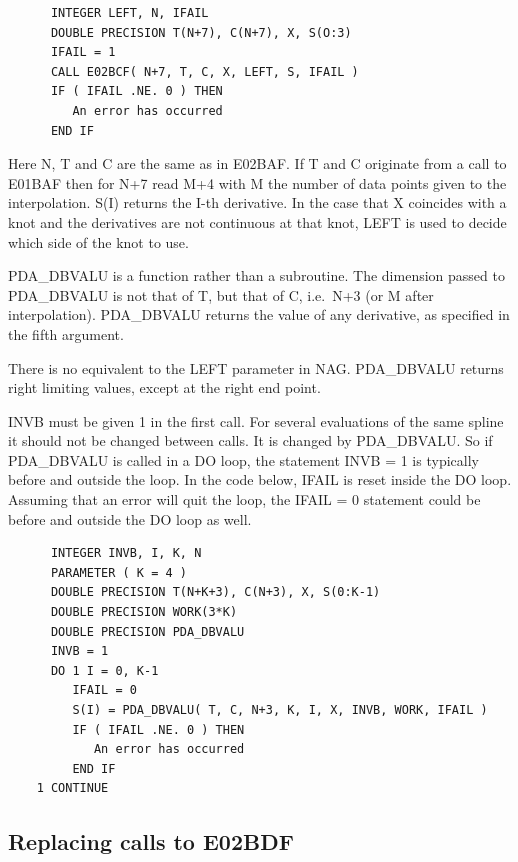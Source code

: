 \documentclass[11pt,twoside]{article}
\newcommand{\htmlref}[2]{#1}
\newcommand{\xlabel}[1]{}
\begin{document}
\begin{verbatim}
      INTEGER LEFT, N, IFAIL
      DOUBLE PRECISION T(N+7), C(N+7), X, S(O:3)
      IFAIL = 1
      CALL E02BCF( N+7, T, C, X, LEFT, S, IFAIL )
      IF ( IFAIL .NE. 0 ) THEN
         An error has occurred
      END IF
\end{verbatim}

   Here N, T and C are the same as in
\htmlref{E02BAF.}{m_e02baf}
   If T and C originate from
   a call to
\htmlref{E01BAF}{m_e01baf}
   then for N+7 read M+4 with M the number of data
   points given to the interpolation. S(I) returns the I-th derivative.
   In the case that X coincides with a knot and the derivatives are not
   continuous at that knot, LEFT is used to decide which side of the
   knot to use.

   PDA\_DBVALU is a function rather than a subroutine. The dimension passed
   to PDA\_DBVALU is not that of T, but that of C, i.e.\ N+3 (or M after
   interpolation). PDA\_DBVALU returns the value of any derivative, as
   specified in the fifth argument.

   There is no equivalent to
   the LEFT parameter in NAG. PDA\_DBVALU returns right limiting values,
   except at the right end point.

   INVB must be given 1 in the first call. For several evaluations of
   the same spline it should not be changed between calls. It is changed
   by PDA\_DBVALU. So if PDA\_DBVALU is called in a DO loop, the statement INVB =
   1 is typically before and outside the loop. In the code below, IFAIL
   is reset inside the DO loop. Assuming that an error will quit the
   loop, the IFAIL = 0 statement could be before and outside the DO loop
   as well.

\begin{verbatim}
      INTEGER INVB, I, K, N
      PARAMETER ( K = 4 )
      DOUBLE PRECISION T(N+K+3), C(N+3), X, S(0:K-1)
      DOUBLE PRECISION WORK(3*K)
      DOUBLE PRECISION PDA_DBVALU
      INVB = 1
      DO 1 I = 0, K-1
         IFAIL = 0
         S(I) = PDA_DBVALU( T, C, N+3, K, I, X, INVB, WORK, IFAIL )
         IF ( IFAIL .NE. 0 ) THEN
            An error has occurred
         END IF
    1 CONTINUE
\end{verbatim}


\subsection{\xlabel{replacing_calls_to_e02bdf}Replacing calls to E02BDF}
\end{document}
